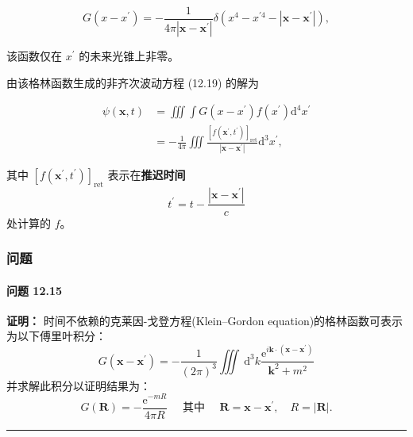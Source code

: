 \begin{equation}\label{eq:12.22} 
 G\left(x-x^{\prime}\right)=-\frac{1}{4 \pi\left|\mathbf{x}-\mathbf{x}^{\prime}\right|} \delta\left(x^{4}-x^{\prime 4}-\left|\mathbf{x}-\mathbf{x}^{\prime}\right|\right), 
 \end{equation}

该函数仅在 $x^{\prime}$ 的未来光锥上非零。

由该格林函数生成的非齐次波动方程 (12.19) 的解为

\begin{equation}
\begin{aligned}
\psi(\mathbf{x}, t) & =\iiint \int G\left(x-x^{\prime}\right) f\left(x^{\prime}\right) \mathrm{d}^{4} x^{\prime} \\
& =-\frac{1}{4 \pi} \iiint \frac{\left[f\left(\mathbf{x}^{\prime}, t^{\prime}\right)\right]_{\mathrm{ret}}}{\left|\mathbf{x}-\mathbf{x}^{\prime}\right|} \mathrm{d}^{3} x^{\prime},
\end{aligned}
\end{equation}

其中
$\left[f\left(\mathbf{x}^{\prime}, t^{\prime}\right)\right]_{\text{ret}}$
表示在\textbf{推迟时间}
 $$
t^{\prime}=t-\frac{\left|\mathbf{x}-\mathbf{x}^{\prime}\right|}{c}
$$
处计算的 $f$。

\subsubsection{问题}\label{ux95eeux9898-3}

\paragraph{问题 12.15}\label{ux95eeux9898-12.15}

\textbf{证明：}
时间不依赖的克莱因-戈登方程(Klein–Gordon equation)的格林函数可表示为以下傅里叶积分：
 $$
G\left(\mathbf{x}-\mathbf{x}^{\prime}\right)=-\frac{1}{(2 \pi)^{3}} \iiint \mathrm{~d}^{3} k \frac{\mathrm{e}^{i \mathbf{k} \cdot\left(\mathbf{x}-\mathbf{x}^{\prime}\right)}}{\mathbf{k}^{2}+m^{2}}
$$
并求解此积分以证明结果为：
 $$
G(\mathbf{R})=-\frac{\mathrm{e}^{-m R}}{4 \pi R} \quad \text { 其中 } \quad \mathbf{R}=\mathbf{x}-\mathbf{x}^{\prime}, \quad R=|\mathbf{R}|.
$$
\begin{center}\rule{0.5\linewidth}{0.5pt}\end{center}

